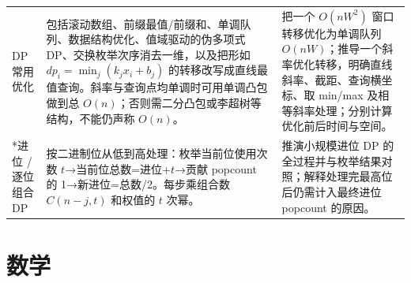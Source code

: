 \documentclass[a4paper,11pt]{article}
\begin{document}
\begin{longtable}{L{2.4cm} L{7.5cm} L{6.8cm}}
DP 常用优化
& 包括滚动数组、前缀最值/前缀和、单调队列、数据结构优化、值域驱动的伪多项式 DP、交换枚举次序消去一维，以及把形如 $dp_i=\min_j(k_jx_i+b_j)$ 的转移改写成直线最值查询。斜率与查询点均单调时可用单调凸包做到总 $O(n)$；否则需二分凸包或李超树等结构，不能仍声称 $O(n)$。
& 把一个 $O(nW^2)$ 窗口转移优化为单调队列 $O(nW)$；推导一个斜率优化转移，明确直线斜率、截距、查询横坐标、取 min/max 及相等斜率处理；分别计算优化前后时间与空间。\\[2mm]

*进位 / 逐位组合 DP
& 按二进制位从低到高处理：枚举当前位使用次数 $t$→当前位总数=进位+$t$→贡献 popcount 的 1→新进位=总数/2。每步乘组合数 $C(n-j,t)$ 和权值的 $t$ 次幂。
& 推演小规模进位 DP 的全过程并与枚举结果对照；解释处理完最高位后仍需计入最终进位 popcount 的原因。\\
\end{longtable}

\newpage
\section{数学}
\end{document}
